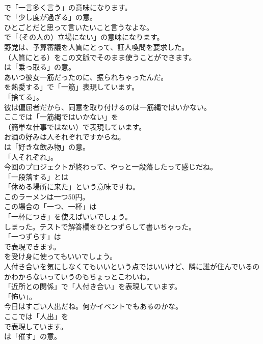 \documentclass[8pt]{extreport}
\begin{document}
\begin{CJK}{UTF8}{min}
\\	で「一言多く言う」の意味になります。
\\	で「少し度が過ぎる」の意。	
\\	ひとごとだと思って言いたいこと言うなよな。 
\\	で「（その人の）立場にない」の意味になります。	
\\	野党は、予算審議を人質にとって、証人喚問を要求した。 
\\	（人質にとる）をこの文脈でそのまま使うことができます。
\\	は「乗っ取る」の意。	
\\	あいつ彼女一筋だったのに、振られちゃったんだ。 
\\	を熱愛する」で「一筋」表現しています。
\\	「捨てる」。	
\\	彼は偏屈者だから、同意を取り付けるのは一筋縄ではいかない。 
\\	ここでは「一筋縄ではいかない」を 
\\	（簡単な仕事ではない）で表現しています。	
\\	お酒の好みは人それぞれですからね。 
\\	は「好きな飲み物」の意。
\\	「人それぞれ」。	
\\	今回のプロジェクトが終わって、やっと一段落したって感じだね。 
\\	「一段落する」とは
\\	「休める場所に来た」という意味ですね。	
\\	このラーメンは一つ50円。 
\\	この場合の「一つ、一杯」は
\\	「一杯につき」を使えばいいでしょう。	
\\	しまった。テストで解答欄をひとつずらして書いちゃった。 
\\	「一つずらす」は
\\	で表現できます。
\\	を受け身に使ってもいいでしょう。	
\\	人付き合いを気にしなくてもいいという点ではいいけど、隣に誰が住んでいるのかわからないっていうのもちょっとこわいね。 
\\	「近所との関係」で「人付き合い」を表現しています。
\\	「怖い」。	
\\	今日はすごい人出だね。何かイベントでもあるのかな。 
\\	ここでは「人出」を 
\\	で表現しています。
\\	は「催す」の意。	

\end{CJK}
\end{document}
